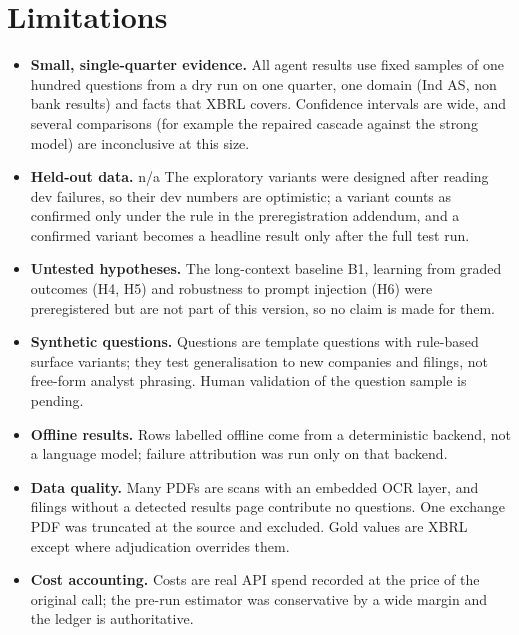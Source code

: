 \documentclass[11pt]{article}
\providecommand{\TestStatusNote}{n/a}
\begin{document}
\section{Limitations}\label{sec:limits}
\begin{itemize}\itemsep0pt
\item \textbf{Small, single-quarter evidence.} All agent results use fixed samples of one hundred questions from a dry run on one quarter, one domain (Ind AS, non bank results) and facts that XBRL covers. Confidence intervals are wide, and several comparisons (for example the repaired cascade against the strong model) are inconclusive at this size.
\item \textbf{Held-out data.} \TestStatusNote{} The exploratory variants were designed after reading dev failures, so their dev numbers are optimistic; a variant counts as confirmed only under the rule in the preregistration addendum, and a confirmed variant becomes a headline result only after the full test run.
\item \textbf{Untested hypotheses.} The long-context baseline B1, learning from graded outcomes (H4, H5) and robustness to prompt injection (H6) were preregistered but are not part of this version, so no claim is made for them.
\item \textbf{Synthetic questions.} Questions are template questions with rule-based surface variants; they test generalisation to new companies and filings, not free-form analyst phrasing. Human validation of the question sample is pending.
\item \textbf{Offline results.} Rows labelled offline come from a deterministic backend, not a language model; failure attribution was run only on that backend.
\item \textbf{Data quality.} Many PDFs are scans with an embedded OCR layer, and filings without a detected results page contribute no questions. One exchange PDF was truncated at the source and excluded. Gold values are XBRL except where adjudication overrides them.
\item \textbf{Cost accounting.} Costs are real API spend recorded at the price of the original call; the pre-run estimator was conservative by a wide margin and the ledger is authoritative.
\end{itemize}
\end{document}
